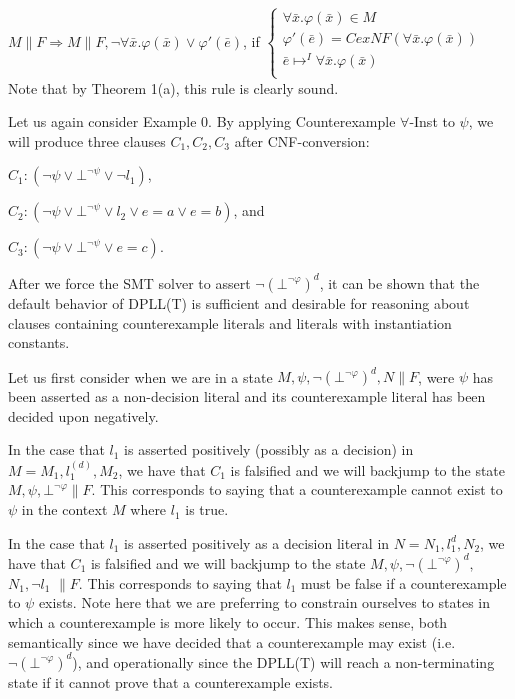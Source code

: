 \documentclass{llncs}
\begin{document}
$M \parallel F \Longrightarrow M \parallel F, \neg \forall \bar{x}. \varphi( \bar{ x } ) \vee \varphi'( \bar{ e } )$, if   
$\begin{cases}
  \forall \bar{x}. \varphi( \bar{ x } ) \in M \\
  \varphi'( \bar{ e } ) = CexNF( \forall \bar{x}. \varphi( \bar{ x } ) ) \\
  \bar{ e } \mapsto^I \forall \bar{x}. \varphi( \bar{ x } ) \\
\end{cases}$ \\

Note that by Theorem 1(a), this rule is clearly sound.

Let us again consider Example 0.
By applying Counterexample $\forall$-Inst to $\psi$, we will produce three clauses $C_1, C_2, C_3$ after CNF-conversion:

$C_1 : ( \neg \psi \vee \bot^{\neg \psi} \vee \neg l_1)$,

$C_2 : ( \neg \psi \vee \bot^{\neg \psi} \vee l_2 \vee e = a \vee e = b )$, and

$C_3 : ( \neg \psi \vee \bot^{\neg \psi} \vee e = c )$.

After we force the SMT solver to assert $\neg( \bot^{\neg \varphi} )^d$, it can be shown that the default behavior of DPLL(T) is sufficient and desirable for reasoning about clauses containing counterexample literals and literals with instantiation constants.

Let us first consider when we are in a state $M, \psi, \neg( \bot^{\neg \varphi} )^d, N \parallel F$, were $\psi$ has been asserted as a non-decision literal and its counterexample literal has been decided upon negatively.

In the case that $l_1$ is asserted positively (possibly as a decision) in $M = M_1, l^{(d)}_1, M_2$, we have that $C_1$ is falsified and we will backjump to the state $M, \psi, \bot^{\neg \varphi} \parallel F$.
This corresponds to saying that a counterexample cannot exist to $\psi$ in the context $M$ where $l_1$ is true.

In the case that $l_1$ is asserted positively as a decision literal in $N = N_1, l^d_1, N_2$, we have that $C_1$ is falsified and we will backjump to the state $M, \psi, \neg( \bot^{\neg \varphi} )^d,$ $N_1, \neg l_1$ $\parallel F$.
This corresponds to saying that $l_1$ must be false if a counterexample to $\psi$ exists.
Note here that we are preferring to constrain ourselves to states in which a counterexample is more likely to occur.
This makes sense, both semantically since we have decided that a counterexample may exist (i.e. $\neg( \bot^{\neg \varphi} )^d$), and operationally since the DPLL(T) will reach a non-terminating state if it cannot prove that a counterexample exists.
\end{document}
